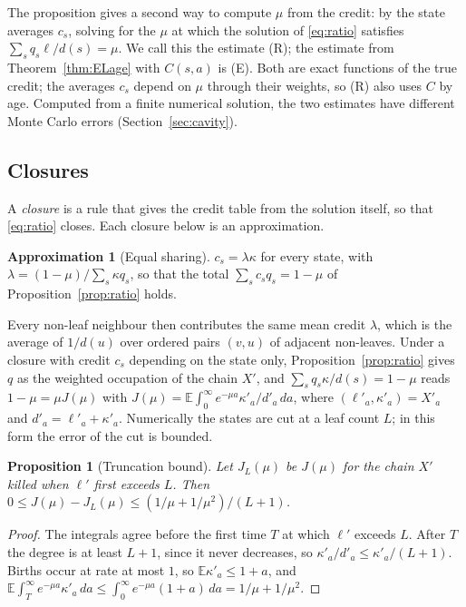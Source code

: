 \documentclass[11pt]{article}
\theoremstyle{plain}
\newtheorem{proposition}[theorem]{Proposition}
\theoremstyle{definition}
\newtheorem{approximation}[theorem]{Approximation}
\theoremstyle{remark}
\begin{document}
The proposition gives a second way to compute $\mu$ from the credit: by the state averages $c_s$, solving for the $\mu$ at which the solution of \eqref{eq:ratio} satisfies $\sum_sq_s\ell/d(s)=\mu$. We call this the estimate (R); the estimate from Theorem~\ref{thm:ELage} with $C(s,a)$ is (E). Both are exact functions of the true credit; the averages $c_s$ depend on $\mu$ through their weights, so (R) also uses $C$ by age. Computed from a finite numerical solution, the two estimates have different Monte Carlo errors (Section~\ref{sec:cavity}).

\subsection{Closures}

A \emph{closure} is a rule that gives the credit table from the solution itself, so that \eqref{eq:ratio} closes. Each closure below is an approximation.

\begin{approximation}[Equal sharing]\label{app:equal}
$c_s=\lambda\kappa$ for every state, with $\lambda=(1-\mu)/\sum_s\kappa q_s$, so that the total $\sum_sc_sq_s=1-\mu$ of Proposition~\ref{prop:ratio} holds.
\end{approximation}

Every non-leaf neighbour then contributes the same mean credit $\lambda$, which is the average of $1/d(u)$ over ordered pairs $(v,u)$ of adjacent non-leaves. Under a closure with credit $c_s$ depending on the state only, Proposition~\ref{prop:ratio} gives $q$ as the weighted occupation of the chain $X'$, and $\sum_sq_s\kappa/d(s)=1-\mu$ reads $1-\mu=\mu J(\mu)$ with $J(\mu)=\mathbb E\int_0^\infty e^{-\mu a}\kappa'_a/d'_a\,da$, where $(\ell'_a,\kappa'_a)=X'_a$ and $d'_a=\ell'_a+\kappa'_a$. Numerically the states are cut at a leaf count $L$; in this form the error of the cut is bounded.

\begin{proposition}[Truncation bound]\label{prop:trunc}
Let $J_L(\mu)$ be $J(\mu)$ for the chain $X'$ killed when $\ell'$ first exceeds $L$. Then $0\le J(\mu)-J_L(\mu)\le(1/\mu+1/\mu^2)/(L+1)$.
\end{proposition}

\begin{proof}
The integrals agree before the first time $T$ at which $\ell'$ exceeds $L$. After $T$ the degree is at least $L+1$, since it never decreases, so $\kappa'_a/d'_a\le\kappa'_a/(L+1)$. Births occur at rate at most $1$, so $\mathbb E\kappa'_a\le1+a$, and $\mathbb E\int_T^\infty e^{-\mu a}\kappa'_a\,da\le\int_0^\infty e^{-\mu a}(1+a)\,da=1/\mu+1/\mu^2$.
\end{proof}
\end{document}
